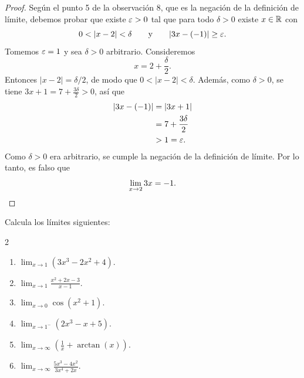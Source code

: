 \documentclass[12pt,a4paper]{article}
\begin{document}
    \begin{proof}
        Según el punto 5 de la observación 8, que es la negación de la definición de límite, debemos probar que existe $\varepsilon>0$ tal que para todo $\delta>0$ existe $x\in\mathbb{R}$ con
        \begin{equation*}
            0<|x-2|<\delta\qquad\text{y}\qquad|3x-(-1)|\geq\e.
        \end{equation*}
        Tomemos $\varepsilon=1$ y sea $\delta>0$ arbitrario. Consideremos
        \begin{equation*}
            x=2+\frac{\delta}{2}.
        \end{equation*}
        Entonces $|x-2|=\delta/2$, de modo que $0<|x-2|<\delta$. Además, como $\delta>0$, se tiene $3x+1=7+\frac{3\delta}{2}>0$, así que
        \begin{align*}
            |3x-(-1)|&=|3x+1|\\
            &=7+\frac{3\delta}{2}\\
            &>1=\varepsilon.
        \end{align*}
        Como $\delta>0$ era arbitrario, se cumple la negación de la definición de límite. Por lo tanto, es falso que
        \begin{equation*}
            \lim_{x\to2}3x=-1.\qedhere
        \end{equation*}
    \end{proof}

    \begin{problema}
        Calcula los límites siguientes:
        \begin{multicols}{2}
            \begin{enumerate}
                \item[(a)] $\displaystyle\lim_{x\to1}\left(3x^{3}-2x^{2}+4\right).$
                \item[(b)] $\displaystyle\lim_{x\to1}\frac{x^{2}+2x-3}{x-1}.$
                \item[(c)] $\displaystyle\lim_{x\to0}\cos\left(x^{2}+1\right).$
                \item[(d)] $\displaystyle\lim_{x\to1^{-}}\left(2x^{3}-x+5\right).$
                \item[(e)] $\displaystyle\lim_{x\to\infty}\left(\frac{1}{x}+\arctan\left(x\right)\right).$
                \item[(f)] $\displaystyle\lim_{x\to\infty}\frac{5x^{3}-4x^{2}}{3x^{4}+2x}.$
            \end{enumerate}
        \end{multicols}
    \end{problema}
\end{document}
